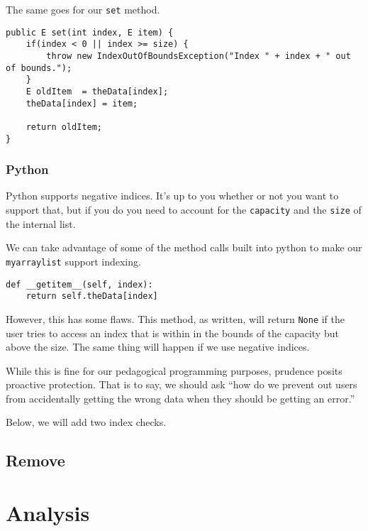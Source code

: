 The same goes for our \texttt{set} method. 
\begin{verbatim}
public E set(int index, E item) {
	if(index < 0 || index >= size) {
		throw new IndexOutOfBoundsException("Index " + index + " out of bounds.");
	}
	E oldItem  = theData[index];
	theData[index] = item;
	
	return oldItem;
}
\end{verbatim}

\subsubsection{Python}

Python supports negative indices.  It's up to you whether or not you want to support that, but if you do you need to account for the \texttt{capacity} and the \texttt{size} of the internal list.


We can take advantage of some of the method calls built into python to make our \texttt{myarraylist} support indexing.

\begin{verbatim}
def __getitem__(self, index):
	return self.theData[index]
\end{verbatim}

However, this has some flaws.
This method, as written, will return \texttt{None} if the user tries to access an index that is within in the bounds of the capacity but above the size.
The same thing will happen if we use negative indices.

While this is fine for our pedagogical programming purposes, prudence posits proactive protection.  That is to say, we should ask ``how do we prevent out users from accidentally getting the wrong data when they should be getting an error.''

Below, we will add two index checks.

\subsection{Remove}



\section{Analysis}




